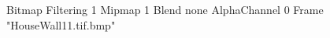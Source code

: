 {Bitmap
	{Filtering 1}
	{Mipmap 1}
	{Blend none}
	{AlphaChannel 0}
	{Frame "HouseWall11.tif.bmp"}
}

